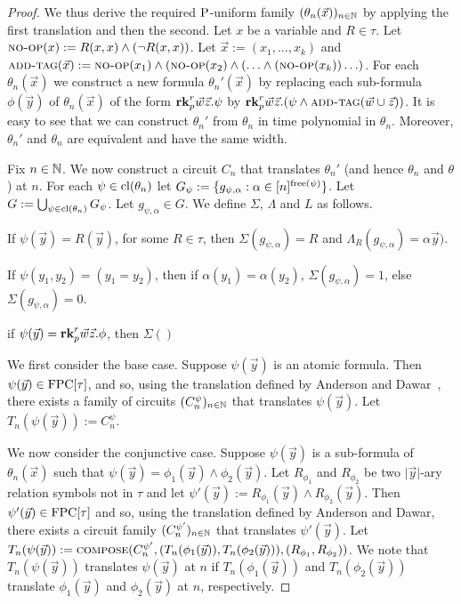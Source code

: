 \documentclass[../paper.tex]{subfiles}
\begin{document}
\begin{proof}
  We thus derive the required $\mathrm{P}$-uniform family $(\theta_n(\vec{x}))_{n \in
    \mathbb{N}}$ by applying the first translation and then the second. Let $x$ be a
  variable and $R \in \tau$. Let ${\normalfont\textsc{no-op}}(x) := R(x, x) \land (\neg R(x,
  x))$. Let $\vec{x} := (x_1, \ldots, x_k)$ and ${\normalfont\textsc{add-tag}} (\vec{x}) :=
  {\normalfont\textsc{no-op}}(x_1) \land ({\normalfont\textsc{no-op}}(x_2) \land ( \ldots \land ({\normalfont\textsc{no-op}}(x_k))
  \ldots)$. For each $\theta_n (\vec{x})$ we construct a new formula $\theta_n'
  (\vec{x})$ by replacing each sub-formula $\phi(\vec{y})$ of
  $\theta_n(\vec{x})$ of the form $\text{\textbf{rk}}^r_p \vec{w} \vec{z} . \psi$ by
  $\text{\textbf{rk}}^r_p \vec{w}\vec{z} . (\psi \land {\normalfont\textsc{add-tag}}(\vec{w} \cup \vec{z}))$.
  It is easy to see that we can construct $\theta_n'$ from $\theta_n$ in time
  polynomial in $\theta_n$. Moreover, $\theta_n'$ and $\theta_n$ are equivalent
  and have the same width.

  

  
  Fix $n \in \mathbb{N}$. We now construct a circuit $C_n$ that translates
  $\theta_n'$ (and hence $\theta_n$ and $\theta$) at $n$. For each $\psi \in
  \mathrm{cl}(\theta_n)$ let $G_\psi := \{g_{\psi, \alpha} : \alpha \in
  [n]^{\mathrm{free}(\psi)} \}$. Let $G := \bigcup_{\psi \in \mathrm{cl}(\theta_n)} G_{\psi}$.
  Let $g_{\psi, \alpha} \in G$. We define $\Sigma$, $\Lambda$ and $L$ as
  follows.
  \begin{itemizens}
  \item If $\psi (\vec{y}) = R(\vec{y})$, for some $R \in \tau$, then $\Sigma
    (g_{\psi, \alpha}) = R$ and $\Lambda_R (g_{\psi, \alpha}) = \alpha
    \vec{y})$.
  \item If $\psi (y_1, y_2) = (y_1 = y_2)$, then if $\alpha (y_1) = \alpha
    (y_2)$, $\Sigma (g_{\psi, \alpha}) = 1$, else $\Sigma (g_{\psi, \alpha}) =
    0$.
  \item if $\psi (\vec{y}) = \text{\textbf{rk}}^r_p \vec{w} \vec{z}. \phi$, then $\Sigma ()$
  \end{itemizens}

 
  

  We first consider the base case. Suppose $\psi(\vec{y})$ is an atomic formula.
  Then $\psi(\vec{y}) \in \text{\upshape FPC}[\tau]$, and so, using the translation defined by
  Anderson and Dawar~\cite{AndersonD17}, there exists a family of circuits
  $(C^{\psi}_n)_{n \in \mathbb{N}}$ that translates $\psi(\vec{y})$. Let
  $T_n(\psi(\vec{y})) := C^{\psi}_n$.

  We now consider the conjunctive case. Suppose $\psi(\vec{y})$ is a sub-formula
  of $\theta_n(\vec{x})$ such that $\psi (\vec{y}) = \phi_1(\vec{y}) \land
  \phi_2(\vec{y})$. Let $R_{\phi_1}$ and $R_{\phi_2}$ be two $\vert \vec{y}
  \vert$-ary relation symbols not in $\tau$ and let $\psi' (\vec{y}) :=
  R_{\phi_1}(\vec{y}) \land R_{\phi_2}(\vec{y})$. Then $\psi'(\vec{y}) \in
  \text{\upshape FPC}[\tau]$ and so, using the translation defined by Anderson and Dawar, there
  exists a circuit family $(C^{\psi'}_n)_{n \in \mathbb{N}}$ that translates
  $\psi'(\vec{y})$. Let $T_n(\psi (\vec{y})) := {\normalfont\textsc{compose}}(C^{\psi'}_n, (
  T_n(\phi_1(\vec{y})), T_n(\phi_2(\vec{y}))), (R_{\phi_1}, R_{\phi_2}))$. We
  note that $T_n(\psi(\vec{y}))$ translates $\psi (\vec{y})$ at $n$ if
  $T_n(\phi_1 (\vec{y}))$ and $T_n(\phi_2(\vec{y}))$ translate $\phi_1(\vec{y})$
  and $\phi_2(\vec{y})$ at $n$, respectively.


\end{proof}
\end{document}
